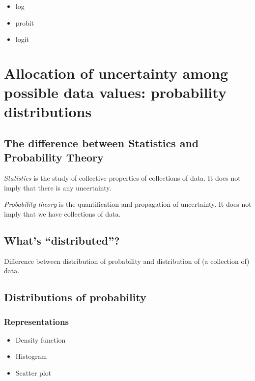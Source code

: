 \documentclass[]{book}
\begin{document}
\begin{itemize}
\item
  log
\item
  probit
\item
  logit
\end{itemize}

\hypertarget{allocation-of-uncertainty-among-possible-data-values-probability-distributions}{%
\chapter{Allocation of uncertainty among possible data values: probability distributions}\label{allocation-of-uncertainty-among-possible-data-values-probability-distributions}}

\hypertarget{the-difference-between-statistics-and-probability-theory}{%
\section{The difference between Statistics and Probability Theory}\label{the-difference-between-statistics-and-probability-theory}}

\emph{Statistics} is the study of collective properties of collections of data. It does not imply that there is any uncertainty.

\emph{Probability theory} is the quantification and propagation of uncertainty. It does not imply that we have collections of data.

\hypertarget{whats-distributed}{%
\section{What's ``distributed''?}\label{whats-distributed}}

Difference between distribution of probability and distribution of (a collection of) data.

\hypertarget{distributions-of-probability}{%
\section{Distributions of probability}\label{distributions-of-probability}}

\hypertarget{representations}{%
\subsection{Representations}\label{representations}}

\begin{itemize}
\item
  Density function
\item
  Histogram
\item
  Scatter plot
\end{itemize}
\end{document}
